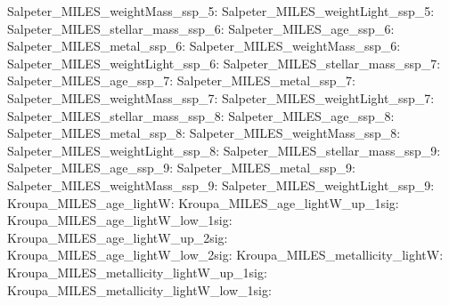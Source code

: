 Salpeter\_MILES\_weightMass\_ssp\_5:  \newline 
Salpeter\_MILES\_weightLight\_ssp\_5:  \newline 
Salpeter\_MILES\_stellar\_mass\_ssp\_6:  \newline 
Salpeter\_MILES\_age\_ssp\_6:  \newline 
Salpeter\_MILES\_metal\_ssp\_6:  \newline 
Salpeter\_MILES\_weightMass\_ssp\_6:  \newline 
Salpeter\_MILES\_weightLight\_ssp\_6:  \newline 
Salpeter\_MILES\_stellar\_mass\_ssp\_7:  \newline 
Salpeter\_MILES\_age\_ssp\_7:  \newline 
Salpeter\_MILES\_metal\_ssp\_7:  \newline 
Salpeter\_MILES\_weightMass\_ssp\_7:  \newline 
Salpeter\_MILES\_weightLight\_ssp\_7:  \newline 
Salpeter\_MILES\_stellar\_mass\_ssp\_8:  \newline 
Salpeter\_MILES\_age\_ssp\_8:  \newline 
Salpeter\_MILES\_metal\_ssp\_8:  \newline 
Salpeter\_MILES\_weightMass\_ssp\_8:  \newline 
Salpeter\_MILES\_weightLight\_ssp\_8:  \newline 
Salpeter\_MILES\_stellar\_mass\_ssp\_9:  \newline 
Salpeter\_MILES\_age\_ssp\_9:  \newline 
Salpeter\_MILES\_metal\_ssp\_9:  \newline 
Salpeter\_MILES\_weightMass\_ssp\_9:  \newline 
Salpeter\_MILES\_weightLight\_ssp\_9:  \newline 
Kroupa\_MILES\_age\_lightW:  \newline 
Kroupa\_MILES\_age\_lightW\_up\_1sig:  \newline 
Kroupa\_MILES\_age\_lightW\_low\_1sig:  \newline 
Kroupa\_MILES\_age\_lightW\_up\_2sig:  \newline 
Kroupa\_MILES\_age\_lightW\_low\_2sig:  \newline 
Kroupa\_MILES\_metallicity\_lightW:  \newline 
Kroupa\_MILES\_metallicity\_lightW\_up\_1sig:  \newline 
Kroupa\_MILES\_metallicity\_lightW\_low\_1sig:  \newline 
